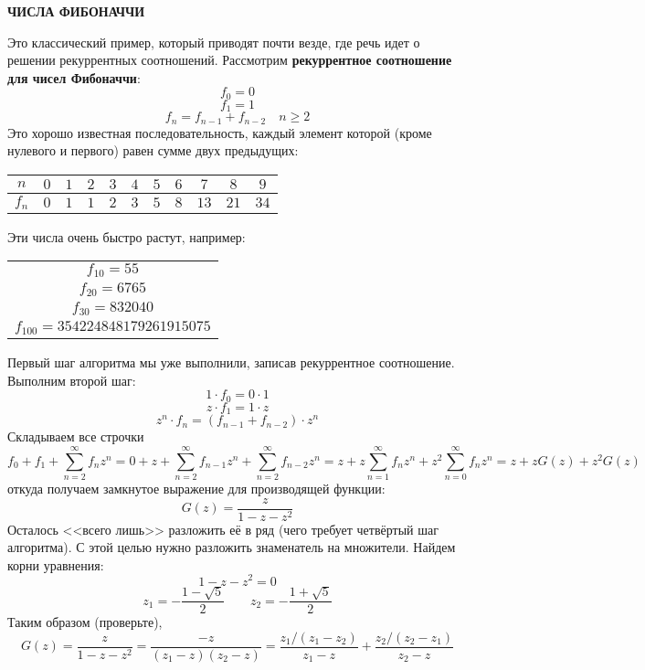 \documentclass[12pt, letterpaper]{extarticle}
\begin{document}
\begin{center}
  \textbf{ЧИСЛА ФИБОНАЧЧИ}
\end{center}

Это классический пример, который приводят почти везде, где речь идет о решении рекуррентных соотношений. Рассмотрим \textbf{рекуррентное соотношение для чисел Фибоначчи}:
\[f_0=0\]
\[f_1=1\]
\[f_n=f_{n-1}+f_{n-2}\quad n\geq2\]
Это хорошо известная последовательность, каждый элемент которой (кроме нулевого и первого) равен сумме двух предыдущих:

\begin{center}\begin{tabular}{|c|c c c c c c c c c c|}
  \hline
  $n$ & $0$ & $1$ & $2$ & $3$ & $4$ & $5$ & $6$ & $7$ & $8$ & $9$ \\
  \hline
  $f_n$ & $0$ & $1$ & $1$ & $2$ & $3$ & $5$ & $8$ & $13$ & $21$ & $34$ \\
  \hline
\end{tabular}\end{center}
Эти числа очень быстро растут, например:
\begin{center}\begin{tabular}{c}
  $f_{10}=55$ \\ $f_{20}=6765$ \\ $f_{30}=832040$ \\ $f_{100}=354224848179261915075$
\end{tabular}\end{center}

Первый шаг алгоритма мы уже выполнили, записав рекуррентное соотношение. Выполним второй шаг:
\[1\cdot f_0=0\cdot 1\]
\[z\cdot f_1=1\cdot z\]
\[z^n\cdot f_{n}=(f_{n-1}+f_{n-2})\cdot z^n\]
Складываем все строчки
\[f_0+f_1+\sum_{n=2}^{\infty}f_nz^n=0+z+\sum_{n=2}^{\infty}f_{n-1}z^n+\sum_{n=2}^{\infty}f_{n-2}z^n=z+z\sum_{n=1}^{\infty}f_nz^n+z^2\sum_{n=0}^{\infty}f_nz^n=z+zG(z)+z^2G(z)\]
откуда получаем замкнутое выражение для производящей функции:
\[G(z)=\frac{z}{1-z-z^2}\]
Осталось <<всего лишь>> разложить её в ряд (чего требует четвёртый шаг алгоритма). С этой целью нужно разложить знаменатель на множители. Найдем корни уравнения:
\[1-z-z^2=0\]
\[z_1=-\frac{1-\sqrt{5}}{2}\qquad z_2=-\frac{1+\sqrt{5}}{2}\]
Таким образом (проверьте),
\[G(z)=\frac{z}{1-z-z^2}=\frac{-z}{(z_1-z)(z_2-z)}=\frac{z_1/(z_1-z_2)}{z_1-z}+\frac{z_2/(z_2-z_1)}{z_2-z}\]
\end{document}
